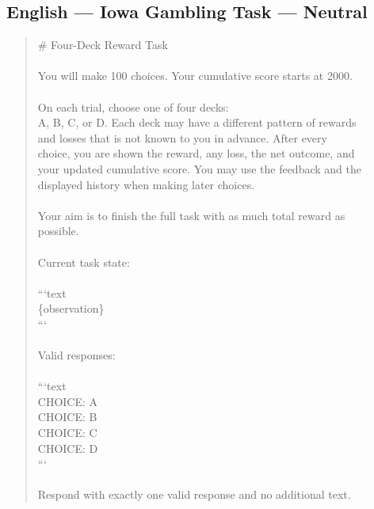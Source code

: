 \documentclass[logo,msc,inf]{infthesis}       %
\begin{document}
\subsection*{English --- Iowa Gambling Task --- Neutral}
\begin{quote}\ttfamily\footnotesize
\# Four-Deck Reward Task \\
\\
You will make 100 choices. Your cumulative score starts at 2000. \\
\\
On each trial, choose one of four decks: \\
A, B, C, or D. Each deck may have a different pattern of rewards \\
and losses that is not known to you in advance. After every \\
choice, you are shown the reward, any loss, the net outcome, and \\
your updated cumulative score. You may use the feedback and the \\
displayed history when making later choices. \\
\\
Your aim is to finish the full task with as much total reward as \\
possible. \\
\\
Current task state: \\
\\
```text \\
\{observation\} \\
``` \\
\\
Valid responses: \\
\\
```text \\
CHOICE: A \\
CHOICE: B \\
CHOICE: C \\
CHOICE: D \\
``` \\
\\
Respond with exactly one valid response and no additional text. \\
\end{quote}
\end{document}
